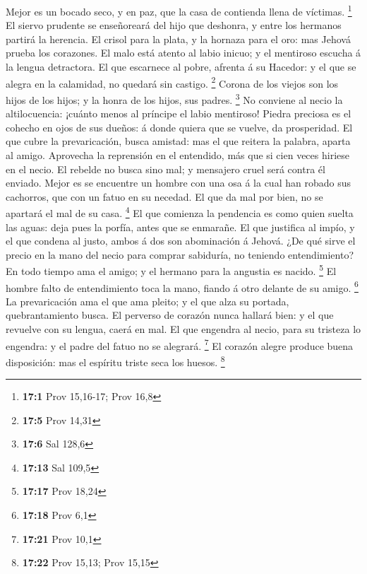  Mejor es un bocado seco, y en paz, que la casa de
contienda llena de víctimas. \footnote{\textbf{17:1} Prov 15,16-17; Prov
  16,8}  El siervo prudente se enseñoreará del hijo que
deshonra, y entre los hermanos partirá la herencia.  El
crisol para la plata, y la hornaza para el oro: mas Jehová prueba los
corazones.  El malo está atento al labio inicuo; y el
mentiroso escucha á la lengua detractora.  El que
escarnece al pobre, afrenta á su Hacedor: y el que se alegra en la
calamidad, no quedará sin castigo. \footnote{\textbf{17:5} Prov 14,31}
 Corona de los viejos son los hijos de los hijos; y la
honra de los hijos, sus padres. \footnote{\textbf{17:6} Sal 128,6}
 No conviene al necio la altilocuencia: ¡cuánto menos al
príncipe el labio mentiroso!  Piedra preciosa es el
cohecho en ojos de sus dueños: á donde quiera que se vuelve, da
prosperidad.  El que cubre la prevaricación, busca
amistad: mas el que reitera la palabra, aparta al amigo. 
Aprovecha la reprensión en el entendido, más que si cien veces hiriese
en el necio.  El rebelde no busca sino mal; y mensajero
cruel será contra él enviado.  Mejor es se encuentre un
hombre con una osa á la cual han robado sus cachorros, que con un fatuo
en su necedad.  El que da mal por bien, no se apartará el
mal de su casa. \footnote{\textbf{17:13} Sal 109,5}  El
que comienza la pendencia es como quien suelta las aguas: deja pues la
porfía, antes que se enmarañe.  El que justifica al
impío, y el que condena al justo, ambos á dos son abominación á Jehová.
 ¿De qué sirve el precio en la mano del necio para
comprar sabiduría, no teniendo entendimiento?  En todo
tiempo ama el amigo; y el hermano para la angustia es nacido.
\footnote{\textbf{17:17} Prov 18,24}  El hombre falto de
entendimiento toca la mano, fiando á otro delante de su amigo.
\footnote{\textbf{17:18} Prov 6,1}  La prevaricación ama
el que ama pleito; y el que alza su portada, quebrantamiento busca.
 El perverso de corazón nunca hallará bien: y el que
revuelve con su lengua, caerá en mal.  El que engendra al
necio, para su tristeza lo engendra: y el padre del fatuo no se
alegrará. \footnote{\textbf{17:21} Prov 10,1}  El corazón
alegre produce buena disposición: mas el espíritu triste seca los
huesos. \footnote{\textbf{17:22} Prov 15,13; Prov 15,15} 
